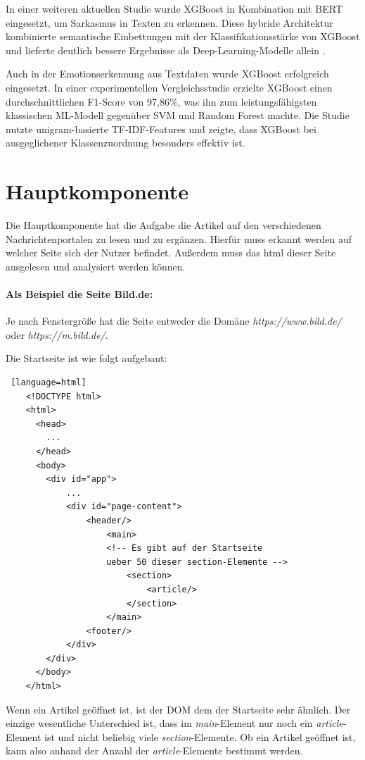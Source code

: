 In einer weiteren aktuellen Studie wurde XGBoost in Kombination mit BERT eingesetzt, um Sarkasmus in Texten zu erkennen. 
Diese hybride Architektur kombinierte semantische Einbettungen mit der Klassifikationsstärke von XGBoost und lieferte deutlich bessere 
Ergebnisse als Deep-Learning-Modelle allein \cite{sharma2025}.

Auch in der Emotionserkennung aus Textdaten wurde XGBoost erfolgreich eingesetzt. 
In einer experimentellen Vergleichsstudie erzielte XGBoost einen durchschnittlichen F1-Score von 97{,}86\%, 
was ihn zum leistungsfähigsten klassischen ML-Modell gegenüber SVM und Random Forest machte\cite{paksoy2024}. 
Die Studie nutzte unigram-basierte TF-IDF-Features und zeigte, dass XGBoost bei ausgeglichener Klassenzuordnung besonders effektiv ist.


\section{Hauptkomponente} \label{sec:06:hauptkomponente}

Die Hauptkomponente hat die Aufgabe die Artikel auf den verschiedenen Nachrichtenportalen zu lesen und zu ergänzen.
Hierfür muss erkannt werden auf welcher Seite sich der Nutzer befindet. Außerdem muss das html dieser Seite ausgelesen und analysiert werden können.

\paragraph{Als Beispiel die Seite Bild.de:} 
Je nach Fenstergröße hat die Seite entweder die Domäne \textit{https://www.bild.de/} oder \textit{https://m.bild.de/}.

Die Startseite ist wie folgt aufgebaut:

\begin{lstlisting} [language=html]
    <!DOCTYPE html>
    <html>
      <head>
        ...
      </head>
      <body>
        <div id="app">
            ...
            <div id="page-content">
                <header/>
                    <main>
                    <!-- Es gibt auf der Startseite 
                    ueber 50 dieser section-Elemente -->
                        <section>
                            <article/>
                        </section>
                    </main>
                <footer/>
            </div>    
        </div>
      </body>
    </html>
\end{lstlisting}

Wenn ein Artikel geöffnet ist, ist der DOM dem der Startseite sehr ähnlich. Der einzige wesentliche Unterschied ist, dass im \textit{main}-Element
nur noch ein \textit{article}-Element ist und nicht beliebig viele \textit{section}-Elemente.
Ob ein Artikel geöffnet ist, kann also anhand der Anzahl der \textit{article}-Elemente bestimmt werden.

